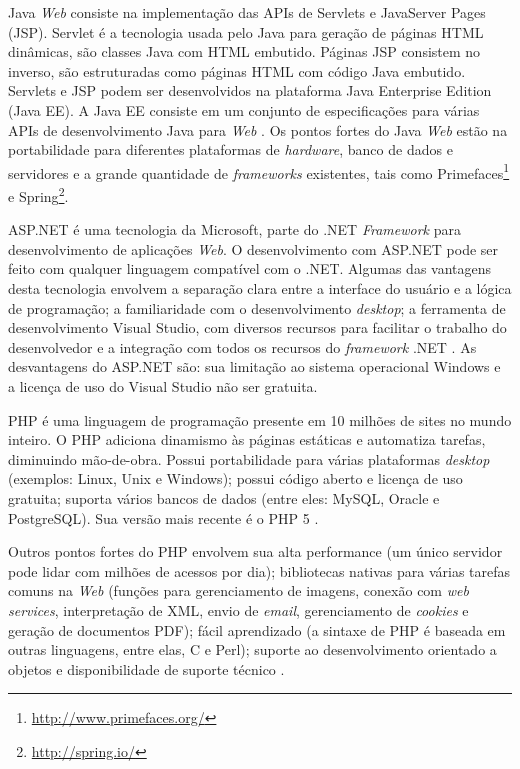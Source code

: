 Java \textit{Web} consiste na implementação das APIs de Servlets e JavaServer Pages (JSP). Servlet é a tecnologia usada pelo Java para geração de páginas HTML dinâmicas, são classes Java com HTML embutido. Páginas JSP consistem no inverso, são estruturadas como páginas HTML com código Java embutido. Servlets e JSP podem ser desenvolvidos na plataforma Java Enterprise Edition (Java EE). A Java EE consiste em um conjunto de especificações para várias APIs de desenvolvimento Java para \textit{Web} \cite{basham2008}. Os pontos fortes do Java \textit{Web} estão na portabilidade para diferentes plataformas de \textit{hardware}, banco de dados e servidores e a grande quantidade de \textit{frameworks} existentes, tais como Primefaces\footnote{\url{http://www.primefaces.org/}} e Spring\footnote{\url{http://spring.io/}}. \par

ASP.NET é uma tecnologia da Microsoft, parte do .NET \textit{Framework} para desenvolvimento de aplicações \textit{Web}. O desenvolvimento com ASP.NET pode ser feito com qualquer linguagem compatível com o .NET. Algumas das vantagens desta tecnologia envolvem a separação clara entre a interface do usuário e a lógica de programação; a familiaridade com o desenvolvimento \textit{desktop}; a ferramenta de desenvolvimento Visual Studio, com diversos recursos para facilitar o trabalho do desenvolvedor e a integração com todos os recursos do \textit{framework} .NET \cite{imar2014}. As desvantagens do ASP.NET são: sua limitação ao sistema operacional Windows e a licença de uso do Visual Studio não ser gratuita. \par

PHP é uma linguagem de programação presente em 10 milhões de sites no mundo inteiro. O PHP adiciona dinamismo às páginas estáticas e automatiza tarefas, diminuindo mão-de-obra. Possui portabilidade para várias plataformas \textit{desktop} (exemplos: Linux, Unix e Windows); possui código aberto e licença de uso gratuita; suporta vários bancos de dados (entre eles: MySQL, Oracle e PostgreSQL). Sua versão mais recente é o PHP 5 \cite{niederauer2004, welling2003}. \par

Outros pontos fortes do PHP envolvem sua alta performance (um único servidor pode lidar com milhões de acessos por dia); bibliotecas nativas para várias tarefas comuns na \textit{Web} (funções para gerenciamento de imagens, conexão com \textit{web services}, interpretação de XML, envio de \textit{email}, gerenciamento de \textit{cookies} e geração de documentos PDF); fácil aprendizado (a sintaxe de PHP é baseada em outras linguagens, entre elas, C e Perl); suporte ao desenvolvimento orientado a objetos e disponibilidade de suporte técnico \cite{welling2003}. \par

